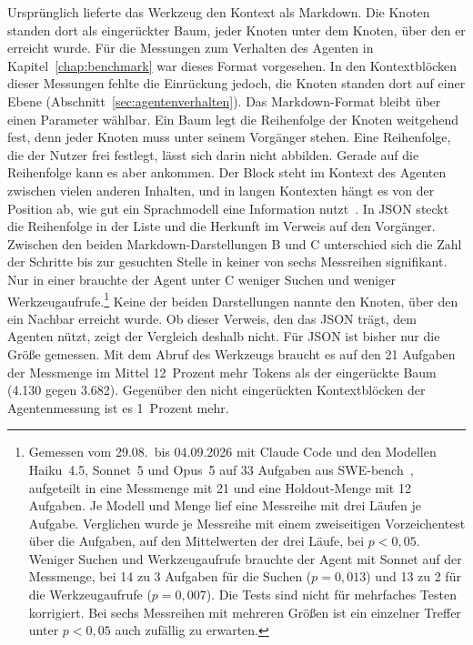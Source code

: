 Ursprünglich lieferte das Werkzeug den Kontext als Markdown. Die Knoten standen dort als eingerückter Baum, jeder Knoten unter dem Knoten, über den er erreicht wurde. Für die Messungen zum Verhalten des Agenten in Kapitel~\ref{chap:benchmark} war dieses Format vorgesehen. In den Kontextblöcken dieser Messungen fehlte die Einrückung jedoch, die Knoten standen dort auf einer Ebene (Abschnitt~\ref{sec:agentenverhalten}). Das Markdown-Format bleibt über einen Parameter wählbar. Ein Baum legt die Reihenfolge der Knoten weitgehend fest, denn jeder Knoten muss unter seinem Vorgänger stehen. Eine Reihenfolge, die der Nutzer frei festlegt, lässt sich darin nicht abbilden. Gerade auf die Reihenfolge kann es aber ankommen. Der Block steht im Kontext des Agenten zwischen vielen anderen Inhalten, und in langen Kontexten hängt es von der Position ab, wie gut ein Sprachmodell eine Information nutzt~\parencite{liu2023lostmiddle}. In JSON steckt die Reihenfolge in der Liste und die Herkunft im Verweis auf den Vorgänger. Zwischen den beiden Markdown-Darstellungen B und C unterschied sich die Zahl der Schritte bis zur gesuchten Stelle in keiner von sechs Messreihen signifikant. Nur in einer brauchte der Agent unter C weniger Suchen und weniger Werkzeugaufrufe.\footnote{Gemessen vom 29.08.\ bis 04.09.2026 mit Claude Code und den Modellen Haiku~4.5, Sonnet~5 und Opus~5 auf 33 Aufgaben aus SWE-bench~\parencite{jimenez2024swebench}, aufgeteilt in eine Messmenge mit 21 und eine Holdout-Menge mit 12 Aufgaben. Je Modell und Menge lief eine Messreihe mit drei Läufen je Aufgabe. Verglichen wurde je Messreihe mit einem zweiseitigen Vorzeichentest über die Aufgaben, auf den Mittelwerten der drei Läufe, bei $p < 0{,}05$. Weniger Suchen und Werkzeugaufrufe brauchte der Agent mit Sonnet auf der Messmenge, bei 14 zu 3 Aufgaben für die Suchen ($p = 0{,}013$) und 13 zu 2 für die Werkzeugaufrufe ($p = 0{,}007$). Die Tests sind nicht für mehrfaches Testen korrigiert. Bei sechs Messreihen mit mehreren Größen ist ein einzelner Treffer unter $p < 0{,}05$ auch zufällig zu erwarten.} Keine der beiden Darstellungen nannte den Knoten, über den ein Nachbar erreicht wurde. Ob dieser Verweis, den das JSON trägt, dem Agenten nützt, zeigt der Vergleich deshalb nicht. Für JSON ist bisher nur die Größe gemessen. Mit dem Abruf des Werkzeugs braucht es auf den 21 Aufgaben der Messmenge im Mittel 12~Prozent mehr Tokens als der eingerückte Baum (4.130 gegen 3.682). Gegenüber den nicht eingerückten Kontextblöcken der Agentenmessung ist es 1~Prozent mehr.
